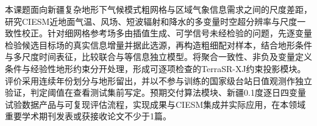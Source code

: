 本课题面向新疆复杂地形下气候模式粗网格与区域气象信息需求之间的尺度差距，研究CIESM近地面气温、风场、短波辐射和降水的多变量时空超分辨率与尺度一致性校正。针对细网格参考场多由插值生成、可学信号未经检验的问题，先逐变量检验候选目标场的真实信息增量并据此选源，再构造粗细配对样本，结合地形条件与多尺度时间表征，比较联合与等信息独立模型。将聚合一致性、非负及变量定义条件与经验性地形约束分开处理，形成可逐项检查的TerraSR-XJ约束投影模块。评价采用连续年份划分与地形留出，并以不参与训练的国家级台站日值观测作独立验证，判定阈值在查看测试集前写定。预期交付算法模块、新疆0.1度逐日四变量试验数据产品与可复现评估流程，实现成果与CIESM集成并实际应用，在本领域重要学术期刊发表或获接收论文不少于1篇。
